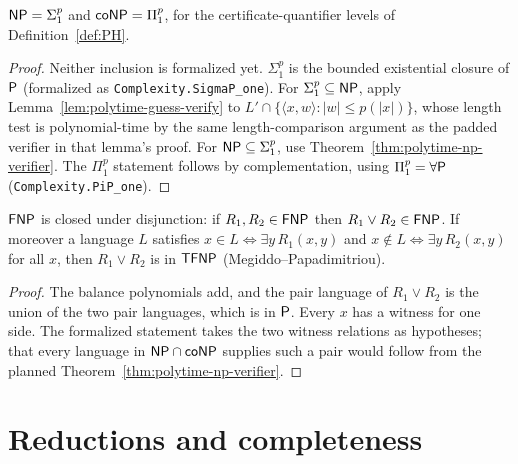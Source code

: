 \begin{theorem}[$\cc{NP} = \Sigma^p_1$]
  \label{thm:polytime-np-sigma1}
  $\cc{NP} = \Sigma^p_1$ and $\mathsf{coNP} = \Pi^p_1$, for the
  certificate-quantifier levels of Definition~\ref{def:PH}.
\end{theorem}
\begin{proof}
  Neither inclusion is formalized yet. $\Sigma^p_1$ is the bounded
  existential closure of $\mathsf{P}$ (formalized as
  \texttt{Complexity.SigmaP\_one}). For $\Sigma^p_1 \subseteq \mathsf{NP}$, apply
  Lemma~\ref{lem:polytime-guess-verify} to $L' \cap \{\langle x, w \rangle :
  |w| \le p(|x|)\}$, whose length test is polynomial-time by the same
  length-comparison argument as the padded verifier in that lemma's proof. For
  $\mathsf{NP} \subseteq \Sigma^p_1$, use Theorem~\ref{thm:polytime-np-verifier}.
  The $\Pi^p_1$ statement follows by complementation, using
  $\Pi^p_1 = \forall \mathsf{P}$ (\texttt{Complexity.PiP\_one}).
\end{proof}

\begin{theorem}
  \label{thm:polytime-tfnp}
  \leanok
  $\mathsf{FNP}$ is closed under disjunction: if $R_1, R_2 \in \mathsf{FNP}$ then
  $R_1 \vee R_2 \in \mathsf{FNP}$. If moreover a language $L$ satisfies
  $x \in L \iff \exists y\, R_1(x, y)$ and
  $x \notin L \iff \exists y\, R_2(x, y)$ for all $x$, then
  $R_1 \vee R_2$ is in $\mathsf{TFNP}$ (Megiddo--Papadimitriou).
\end{theorem}
\begin{proof}
  \leanok
  The balance polynomials add, and the pair language of $R_1 \vee R_2$ is the
  union of the two pair languages, which is in $\mathsf{P}$. Every $x$ has a
  witness for one side. The formalized statement takes the two witness
  relations as hypotheses; that every language in $\mathsf{NP} \cap \mathsf{coNP}$
  supplies such a pair would follow from the planned
  Theorem~\ref{thm:polytime-np-verifier}.
\end{proof}

\section{Reductions and completeness}

